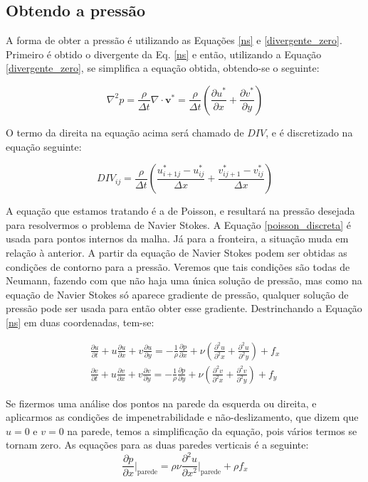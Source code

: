 \documentclass[journal]{IEEEtran}
\begin{document}
\subsection{Obtendo a pressão}
A forma de obter a pressão é utilizando as Equações \ref{ns} e \ref{divergente_zero}. Primeiro é obtido o divergente da Eq. \ref{ns} e então, utilizando a Equação \ref{divergente_zero}, se simplifica a equação obtida, obtendo-se o seguinte:

\begin{equation}
\nabla^2 p = \frac{\rho}{\Delta t} \nabla\cdot \textbf{v}^*=\frac{\rho}{\Delta t} 
\left( \frac{\partial u^*}{\partial x}+\frac{\partial v^*}{\partial y} \right) \label{poisson_ns}
\end{equation}

O termo da direita na equação acima será chamado de $DIV$, e é discretizado na equação seguinte:

\begin{equation}
DIV_{ij}=\frac{\rho}{\Delta t}\left( \frac{u_{i+1j}^*-u_{ij}^*}{\Delta x}+\frac{v_{ij+1}^*-v_{ij}^*}{\Delta x}\right)
\end{equation}

A equação que estamos tratando é a de Poisson, e resultará na pressão desejada para resolvermos o problema de Navier Stokes. A Equação \ref{poisson_discreta} é usada para pontos internos da malha. Já para a fronteira, a situação muda em relação à anterior. A partir da equação de Navier Stokes podem ser obtidas as condições de contorno para a pressão. Veremos que tais condições são todas de Neumann, fazendo com que não haja uma única solução de pressão, mas como na equação de Navier Stokes só aparece gradiente de pressão, qualquer solução de pressão pode ser usada para então obter esse gradiente. Destrinchando a Equação \ref{ns} em duas coordenadas, tem-se:

\begin{eqnarray}
\frac{\partial u}{\partial t}+u\frac{\partial u}{\partial x}+v\frac{\partial
u}{\partial y}=-\frac{1}{\rho}\frac{\partial p}{\partial
x}+\nu\left(\frac{\partial^2 u}{\partial^2 x}+\frac{\partial^2 u}{\partial^2
y}\right)+f_x\\
\frac{\partial v}{\partial t}+u\frac{\partial v}{\partial x}+v\frac{\partial
v}{\partial y}=-\frac{1}{\rho}\frac{\partial p}{\partial
y}+\nu\left(\frac{\partial^2 v}{\partial^2 x}+\frac{\partial^2 v}{\partial^2
y}\right)+f_y
\end{eqnarray}

Se fizermos uma análise dos pontos na parede da esquerda ou
direita, e aplicarmos as condições de impenetrabilidade e não-deslizamento, que
dizem que $u=0$ e $v=0$ na parede, temos a simplificação da equação, pois vários
termos se tornam zero. As equações para as duas paredes verticais é a seguinte:
\begin{equation}
\frac{\partial p}{\partial x}\Bigg|_{\textrm{parede}}=\rho\nu\frac{\partial^2
u}{\partial x^2}\Bigg|_{\textrm{parede}}+\rho f_x \label{parede_vertical_pressao}
\end{equation}
\end{document}
